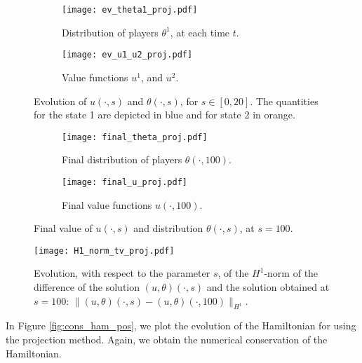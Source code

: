 \documentclass[12pt]{amsart}
\newcommand{\1}{{\chi}}
\theoremstyle{definition}
\begin{document}
        \begin{figure}
      \centering
                      \begin{subfigure}{0.5\textwidth}
          \centering
              \texttt{[image: ev\_theta1\_proj.pdf]}
              \caption{Distribution of players $\theta^1$, at each time $t$.}
                      \end{subfigure}
          \begin{subfigure}{0.5\textwidth}
          \centering
              \texttt{[image: ev\_u1\_u2\_proj.pdf]}
              \caption{Value functions $u^1$, and $u^2$.}
          \end{subfigure}
      \caption{Evolution of $u(\cdot,s)$ and $\theta(\cdot,s)$, for $s\in[0,20]$. The quantities for the state 1 are depicted in blue and for state 2 in orange.}
      \label{BB2}
      \end{figure}
              \begin{figure}
      \centering
                      \begin{subfigure}{0.5\textwidth}
          \centering
              \texttt{[image: final\_theta\_proj.pdf]}
              \caption{Final distribution of players $\theta(\cdot,100)$.}
                      \end{subfigure}
          \begin{subfigure}{0.5\textwidth}
          \centering
              \texttt{[image: final\_u\_proj.pdf]}
              \caption{Final value functions $u(\cdot,100)$.}
          \end{subfigure}
      \caption{Final value of $u(\cdot,s)$ and distribution $\theta(\cdot,s)$, at $s=100$.}
      \label{BB3}
      \end{figure}
              \begin{figure}
                      \centering
                      \texttt{[image: H1\_norm\_tv\_proj.pdf]}
                  \caption{Evolution, with respect to the parameter $s$, of the $H^1$-norm of the difference of the solution $(u,\theta)(\cdot,s)$ and the solution obtained at 
                                                   $s=100$: $\|(u,\theta)(\cdot,s) - (u,\theta)(\cdot,100)\|_{H^1}$. 
                                                   }
                      \label{BB4}
              \end{figure}
        In Figure \ref{fig:cons_ham_pos}, we plot the evolution of the Hamiltonian for using the projection method. Again, we obtain the numerical conservation of the Hamiltonian. 
\end{document}
